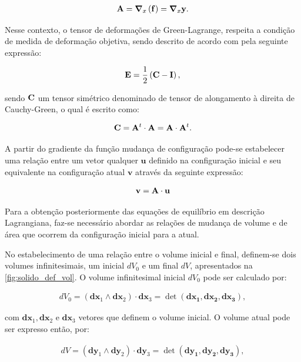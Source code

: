 \begin{align}
	\mathbf{A} = \boldsymbol{\nabla}_x\left(\mathbf{f}\right) = \boldsymbol{\nabla}_x\mathbf{y}.
\end{align}

Nesse contexto, o tensor de deformações de Green-Lagrange, respeita a condição de medida de deformação objetiva, sendo descrito de acordo com  pela seguinte expressão: 

\begin{align}
\mathbf{E} = \frac{1}{2}\left(\mathbf{C} - \mathbf{I}\right),
\end{align}

\noindent sendo $\mathbf{C}$ um tensor simétrico denominado de tensor de alongamento à direita de Cauchy-Green, o qual é escrito como:

\begin{align}
\mathbf{C} = \mathbf{A}^{t} \cdot \mathbf{A} =  \mathbf{A} \cdot \mathbf{A}^{t}.
\end{align}

A partir do gradiente da função mudança de configuração pode-se estabelecer uma relação entre um vetor qualquer $\mathbf{u}$ definido na configuração inicial e seu equivalente na configuração atual $\mathbf{v}$ através da seguinte expressão:

\begin{align}
\mathbf{v} = \mathbf{A} \cdot \mathbf{u} \label{eq:rel_vet}
\end{align}

Para a obtenção posteriormente das equações de equilíbrio em descrição Lagrangiana, faz-se necessário abordar as relações de mudança de volume e de área que ocorrem da configuração inicial para a atual. 

No estabelecimento de uma relação entre o volume inicial e final, definem-se dois volumes infinitesimais, um inicial $dV_{0}$ e um final $dV$, apresentados na \autoref{fig:solido_def_vol}. O volume infinitesimal inicial $dV_{0}$ pode ser calculado por:

\begin{align}
dV_{0} = (\mathbf{dx}_{1} \wedge \mathbf{dx}_{2}) \cdot \mathbf{dx}_{3} = \det{(\mathbf{dx_1},\mathbf{dx_2},\mathbf{dx_3})},
\end{align}

\noindent com $\mathbf{dx}_1,\mathbf{dx}_2$ e $\mathbf{dx}_3$ vetores que definem o volume inicial. O volume atual pode ser expresso então, por:

\begin{align}
dV = (\mathbf{dy}_{1} \wedge \mathbf{dy}_{2}) \cdot \mathbf{dy}_{3} = \det{(\mathbf{dy_1},\mathbf{dy_2},\mathbf{dy_3})}, \label{eq:vol_atual}
\end{align}

